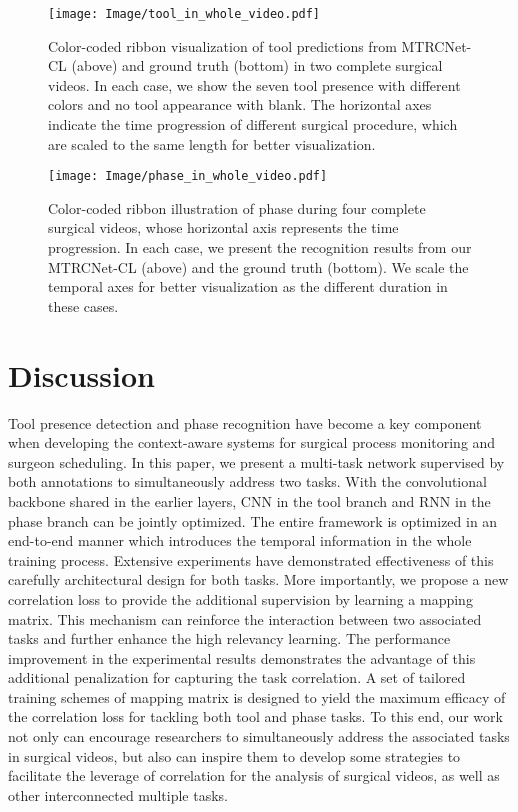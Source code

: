 \documentclass{elsarticle}
\begin{document}
\begin{figure*}[t]
	\color{blue}
	\centering
	\texttt{[image: Image/tool\_in\_whole\_video.pdf]}
\caption{Color-coded ribbon visualization of tool predictions from MTRCNet-CL (above) and ground truth (bottom) in two complete surgical videos. In each case, we show the seven tool presence with different colors and no tool appearance with blank. The horizontal axes indicate the time progression of different surgical procedure, which are scaled to the same length for better visualization.}
	\label{fig:result_tool}
\end{figure*}

\begin{figure*}[t]
	\color{blue}
	\centering
	\texttt{[image: Image/phase\_in\_whole\_video.pdf]}
\caption{Color-coded ribbon illustration of phase during four complete surgical videos, whose horizontal axis represents the time progression. In each case, we present the recognition results from our MTRCNet-CL (above) and the ground truth (bottom).
		We scale the temporal axes for better visualization as the different duration in these cases.}
	\label{fig:result_phase}
\end{figure*}



\section{Discussion}




Tool presence detection and phase recognition have become a key component when developing the context-aware systems for surgical process monitoring and surgeon scheduling.
In this paper, we present a multi-task network supervised by both annotations to simultaneously address two tasks.
With the convolutional backbone shared in the earlier layers, CNN in the tool branch and RNN in the phase branch can be jointly optimized.
The entire framework is optimized in an end-to-end manner which introduces the temporal information in the whole training process.
Extensive experiments have demonstrated effectiveness of this carefully architectural design for both tasks.
More importantly, we propose a new correlation loss to provide the additional supervision by learning a mapping matrix. 
This mechanism can reinforce the interaction between two associated tasks and further enhance the high relevancy learning.
The performance improvement in the experimental results demonstrates the advantage of this additional penalization for capturing the task correlation.
A set of tailored training schemes of mapping matrix is designed to yield the maximum efficacy of the correlation loss for tackling both tool and phase tasks.
To this end, our work not only can encourage researchers to simultaneously address the associated tasks in surgical videos,
but also can inspire them to develop some strategies to facilitate the leverage of correlation for the analysis of surgical videos, as well as other interconnected multiple tasks.
\end{document}
